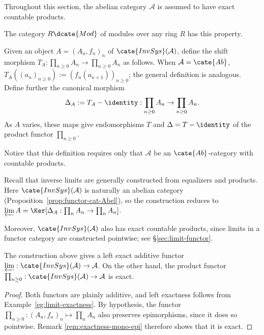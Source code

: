 \begin{hypothesis}\label{hyp:lim1}
	Throughout this section, the abelian category $\mathcal{A}$ is assumed to
	have exact countable products.
\end{hypothesis}

The category $R\dcate{Mod}$ of modules over any ring $R$ has this property.

\begin{definition}\label{def:Delta-diff}
	Given an object $A=(A_n,f_n)_n$ of $\cate{InvSys}(\mathcal{A})$, define
	the shift morphism
	$T_A:\prod_{n\geq0}A_n\to\prod_{n\geq0}A_n$ as follows. When
	$\mathcal{A}=\cate{Ab}$,
	$T_A((a_n)_{n\geq0}):=(f_n(a_{n+1}))_{n\geq0}$; the general definition
	is analogous. Define further the canonical morphism
	\[ \Delta_A := T_A - \identity: \prod_{n \geq 0} A_n \to \prod_{n \geq 0} A_n. \]
	As $A$ varies, these maps give endomorphisms $T$ and
	$\Delta=T-\identity$ of the product functor $\prod_{n\geq0}$.
\end{definition}

Notice that this definition requires only that $\mathcal{A}$ be an
$\cate{Ab}$-category with countable products.

Recall that inverse limits are generally constructed from equalizers and
products. Here $\cate{InvSys}(\mathcal{A})$ is naturally an abelian category
(Proposition~\ref{prop:functor-cat-Abel}), so the construction reduces to
$\varprojlim A=\Ker[\Delta_A:\prod_nA_n\to\prod_nA_n]$.

Moreover, $\cate{InvSys}(\mathcal{A})$ also has exact countable products,
since limits in a functor category are constructed pointwise; see
\S\ref{sec:limit-functor}.

\begin{lemma}
	The construction above gives a left exact additive functor
	$\varprojlim:\cate{InvSys}(\mathcal{A})\to\mathcal{A}$. On the other
	hand, the product functor
	$\prod_{n\geq0}:\cate{InvSys}(\mathcal{A})\to\mathcal{A}$ is exact.
\end{lemma}
\begin{proof}
	Both functors are plainly additive, and left exactness follows from
	Example~\ref{eg:limit-exactness}. By hypothesis, the functor
	$\prod_{n\geq0}:(A_n,f_n)_n\mapsto\prod_nA_n$ also preserves
	epimorphisms, since it does so pointwise. Remark
	\ref{rem:exactness-mono-epi} therefore shows that it is exact.
\end{proof}

